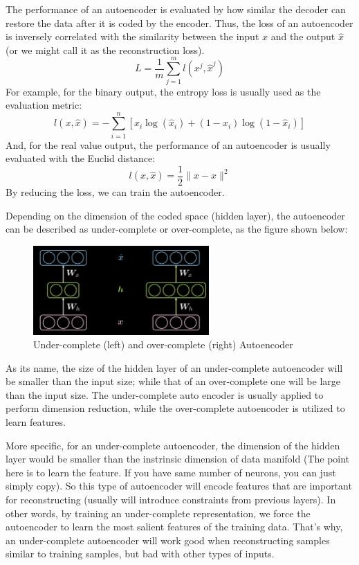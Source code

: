 The performance of an autoencoder is evaluated by how similar the decoder can restore the data after it is coded by the encoder. Thus, the loss of an autoencoder is inversely correlated with the similarity between the input $x$ and the output $\hat{x}$ (or we might call it as the reconstruction loss). 
$$ L=\frac{1}{m}\sum_{j=1}^m l(x^j,\hat{x}^j) $$
For example, for the binary output, the entropy loss is usually used as the evaluation metric:
$$ l(x,\hat{x}) = -\sum_{i=1}^n[x_i\log(\hat{x}_i) + (1-x_i)\log(1-\hat{x}_i) ]$$
And, for the real value output, the performance of an autoencoder is usually evaluated with the Euclid distance:
$$ l(x,\hat{x}) = \frac{1}{2} \| x-\hat{x} \|^2 $$
By reducing the loss, we can train the autoencoder.

Depending on the dimension of the coded space (hidden layer), the autoencoder can be described as under-complete or over-complete, as the figure shown below:

\begin{figure}[htb]
    \centering
    \includegraphics[width=0.6\textwidth]{figs/Under_(over)_complete_Autoencoder.png}
    \caption{Under-complete (left) and over-complete (right) Autoencoder}
    \label{fig:Under_(over)_complete_Autoencoder}
\end{figure}

As its name, the size of the hidden layer of an under-complete autoencoder will be smaller than the input size; while that of an over-complete one will be large than the input size. The under-complete auto encoder is usually applied to perform dimension reduction, while the over-complete autoencoder is utilized to learn features.

More specific, for an under-complete autoencoder, the dimension of the hidden layer would be smaller than the instrinsic dimension of data manifold (The point here is to learn the feature. If you have same number of neurons, you can just simply copy). So this type of autoencoder will encode features that are important for reconstructing (usually will introduce constraints from previous layers). In other words, by training an under-complete representation, we force the autoencoder to learn the most salient features of the training data. That's why, an under-complete autoencoder will work good when reconstructing samples similar to training samples, but bad with other types of inputs.  


